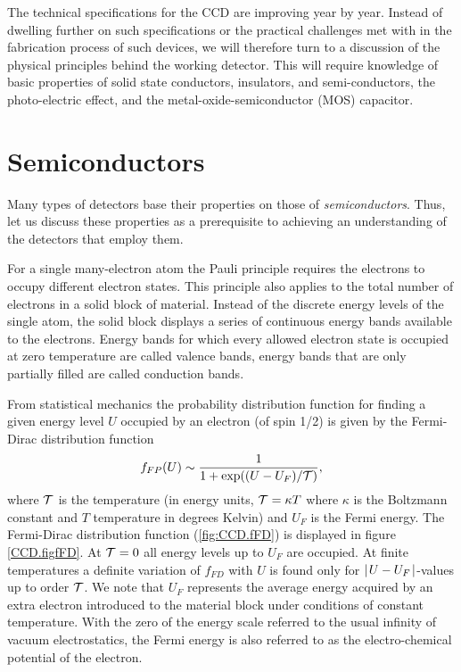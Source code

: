 The technical specifications for the CCD are improving year by
year. Instead of dwelling further on such specifications or the
practical challenges met with in the fabrication process of such
devices, we will therefore turn to a discussion of the physical
principles behind the working detector. This will require knowledge of
basic properties of solid state conductors, insulators, and
semi-conductors, the photo-electric effect, and the
metal-oxide-semiconductor (MOS) capacitor.

\section{Semiconductors}

Many types of detectors base their properties on those of {\it
  semiconductors}. Thus, let us discuss these properties as a
prerequisite to achieving an understanding of the detectors that
employ them. 

For a single many-electron atom the Pauli principle requires the
electrons to occupy different electron states. This principle also
applies to the total number of electrons in a solid block of
material. Instead of the discrete energy levels of the single atom,
the solid block displays a series of continuous energy bands available
to the electrons. Energy bands for which every allowed electron state
is occupied at zero temperature are called valence bands, energy bands
that are only partially filled are called conduction bands. 

From statistical mechanics the probability distribution function for
finding a given energy level $U$ occupied by an electron (of spin 1/2)
is given by the Fermi-Dirac distribution function
\begin{equation}
  f_{FP}(U) \sim \frac{1}{1+\exp((U-U_F)/{\cal T})},
  \label{CCD.fFD}
\end{equation}
where ${\cal T}$ is the temperature (in energy units, ${\cal T} = \kappa T$
where $\kappa$ is the Boltzmann constant and $T$ temperature in
degrees Kelvin) and $U_F$ is the Fermi energy. The Fermi-Dirac
distribution function (\ref{fig:CCD.fFD}) is displayed in figure
\ref{CCD.figfFD}. At ${\cal T} = 0$ all energy levels up to $U_F$ are
occupied. At finite temperatures a definite variation of $f_{FD}$ with
$U$ is found only for $\mid\! U - U_F \!\mid$-values up to order ${\cal T}$. We note that $U_F$ represents the average energy acquired by an
extra electron introduced to the material block under conditions of
constant temperature. With the zero of the energy scale referred to the
usual infinity of vacuum electrostatics, the Fermi energy is also
referred to as the electro-chemical potential of the electron.

